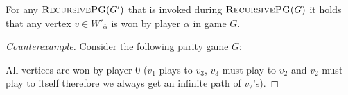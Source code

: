 \begin{conjecture}[Disproven]
	\label{con_opponent_a_always_wins}
	For any $\textsc{RecursivePG}(G')$ that is invoked during $\textsc{RecursivePG}(G)$ it holds that any vertex $v \in W'_{\overline{\alpha}}$ is won by player $\overline{\alpha}$ in game $G$.
	\begin{proof}[Counterexample]
		Consider the following parity game $G$:
		\begin{center}
		\end{center}
		
		All vertices are won by player $0$ ($v_1$ plays to $v_3$, $v_3$ must play to $v_2$ and $v_2$ must play to itself therefore we always get an infinite path of $v_2$'s).
		

\end{proof}
\end{conjecture}
